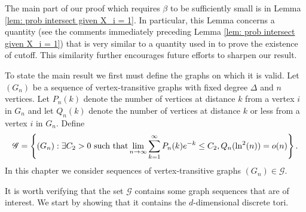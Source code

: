 The main part of our proof which requires $\beta$ to be sufficiently small is in Lemma \ref{lem: prob intersect given X_i = 1}. In particular, this Lemma concerns a quantity (see the comments immediately preceding Lemma \ref{lem: prob intersect given X_i = 1}) that is very similar to a quantity used in \cite{Lubetzky2015-po} to prove the existence of cutoff. This similarity further encourages future efforts to sharpen our result.

To state the main result we first must define the graphs on which it is valid. Let $(G_{n})$ be a sequence of vertex-transitive graphs with fixed degree $\Delta$ and $n$ vertices. Let $P_n(k)$ denote the number of vertices at distance $k$ from a vertex $i$ in $G_n$ and let $Q_n(k)$ denote the number of vertices at distance $k$ or less from a vertex $i$ in $G_n$. Define
\begin{equation}
	\mathscr{G} = \left\{(G_n) : \exists C_2 > 0 \text{ such that} \lim_{n \rightarrow \infty}\sum_{k = 1}^\infty P_n(k)e^{-k} \leq C_2, Q_n(\ln^2(n)) = o(n) \right\}.
	\label{eq:set valid graphs}
\end{equation}
In this chapter we consider sequences of vertex-transitive graphs $(G_n) \in \mathscr{G}$. 

It is worth verifying that the set $\mathscr{G}$ contains some graph sequences that are of interest. We start by showing that it contains the $d$-dimensional discrete tori.

